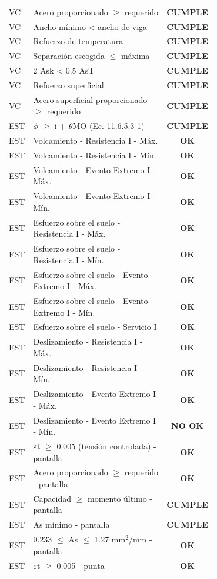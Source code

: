 \documentclass[10pt,a4paper]{article}
\newcommand{\ok}[1]{\textcolor{verde}{\textbf{#1}}}
\newcommand{\nook}[1]{\textcolor{rojo}{\textbf{#1}}}
\begin{document}
\begin{longtable}{@{}l p{0.7\linewidth} c@{}}
VC & Acero proporcionado $\ge$ requerido & \ok{CUMPLE} \\
VC & Ancho mínimo < ancho de viga & \ok{CUMPLE} \\
VC & Refuerzo de temperatura & \ok{CUMPLE} \\
VC & Separación escogida $\le$ máxima & \ok{CUMPLE} \\
VC & 2 Ask < 0.5 AsT & \ok{CUMPLE} \\
VC & Refuerzo superficial & \ok{CUMPLE} \\
VC & Acero superficial proporcionado $\ge$ requerido & \ok{CUMPLE} \\
EST & $\phi$ $\ge$ i + $\theta$MO (Ec. 11.6.5.3-1) & \ok{CUMPLE} \\
EST & Volcamiento - Resistencia I - Máx. & \ok{OK} \\
EST & Volcamiento - Resistencia I - Mín. & \ok{OK} \\
EST & Volcamiento - Evento Extremo I - Máx. & \ok{OK} \\
EST & Volcamiento - Evento Extremo I - Mín. & \ok{OK} \\
EST & Esfuerzo sobre el suelo - Resistencia I - Máx. & \ok{OK} \\
EST & Esfuerzo sobre el suelo - Resistencia I - Mín. & \ok{OK} \\
EST & Esfuerzo sobre el suelo - Evento Extremo I - Máx. & \ok{OK} \\
EST & Esfuerzo sobre el suelo - Evento Extremo I - Mín. & \ok{OK} \\
EST & Esfuerzo sobre el suelo - Servicio I & \ok{OK} \\
EST & Deslizamiento - Resistencia I - Máx. & \ok{OK} \\
EST & Deslizamiento - Resistencia I - Mín. & \ok{OK} \\
EST & Deslizamiento - Evento Extremo I - Máx. & \ok{OK} \\
EST & Deslizamiento - Evento Extremo I - Mín. & \nook{NO OK} \\
EST & $\varepsilon$t $\ge$ 0.005 (tensión controlada) - pantalla & \ok{OK} \\
EST & Acero proporcionado $\ge$ requerido - pantalla & \ok{OK} \\
EST & Capacidad $\ge$ momento último - pantalla & \ok{CUMPLE} \\
EST & As mínimo - pantalla & \ok{CUMPLE} \\
EST & 0.233 $\le$ As $\le$ 1.27 mm$^{2}$/mm - pantalla & \ok{OK} \\
EST & $\varepsilon$t $\ge$ 0.005 - punta & \ok{OK} \\

\end{longtable}
\end{document}

